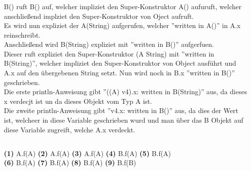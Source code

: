 \documentclass[12pt]{article}
\begin{document}
\subsubsection{}
\begin{center}
    B() ruft B() auf, welcher impliziet den Super-Konstruktor A() aufuruft, welcher anschließend implziet den Super-Konstruktor von Oject aufruft.\\
    Es wird nun expliziet der A(String) aufgerufen, welcher ''written in A()'' in A.x reinschreibt.\\
    Anschließend wird B(String) expliziet mit ''written in B()'' aufgerfuen.\\
    Dieser ruft expliziet den Super-Konstruktor (A String) mit ''written in B(String)'', welcher impliziet den Super-Konstruktor von Object ausführt und A.x auf den übergebenen String setzt. Nun wird noch in B.x ''written in B()'' geschrieben.\\
    Die erste println-Anweisung gibt ''((A) v4).x: written in B(String)'' aus, da dieses x verdecjt ist un da dieses Objekt vom Typ A ist.\\
    Die zweite println-Anweisung gibt ''v4.x: written in B()'' aus, da dies der Wert ist, welcheer in diese Variable geschrieben wurd und man über das B Objekt auf diese Variable zugreift, welche A.x verdeckt.
\end{center}

\subsection{}
\textbf{(1)} A.f(A) \quad \quad \textbf{(2)} A.f(A) \quad \quad \textbf{(3)} A.f(A) \quad \quad \textbf{(4)} B.f(A) \quad \quad \textbf{(5)} B.f(A)\\

\textbf{(6)} B.f(A) \quad \quad \textbf{(7)} B.f(A) \quad \quad \textbf{(8)} B.f(A) \quad \quad \textbf{(9)} B.f(B)
\end{document}
